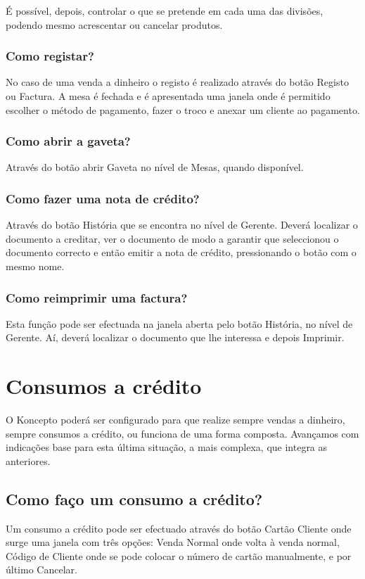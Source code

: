 \documentclass[a4paper,11pt,openany]{memoir}
\begin{document}
É possível, depois, controlar o que se pretende em cada uma das divisões, podendo mesmo acrescentar ou cancelar
produtos.


\subsection{Como registar?}
No caso de uma venda a dinheiro o registo é realizado através do botão Registo ou
Factura. A mesa é fechada e é apresentada uma janela onde é permitido escolher o
método de pagamento, fazer o troco e anexar um cliente ao pagamento.

\subsection{Como abrir a gaveta?}
Através do botão abrir Gaveta no nível de Mesas, quando disponível.


\subsection{Como fazer uma nota de crédito?}
Através do botão História que se encontra no nível de Gerente. Deverá localizar o
documento a creditar, ver o documento de modo a garantir que seleccionou o
documento correcto e então emitir a nota de crédito, pressionando o botão com o
mesmo nome.

\subsection{Como reimprimir uma factura?}
Esta função pode ser efectuada na janela aberta pelo botão História, no nível de
Gerente. Aí, deverá localizar o documento que lhe interessa e depois Imprimir.




\chapter{Consumos a crédito}

O Koncepto poderá ser configurado para que realize sempre vendas a dinheiro,
sempre consumos a crédito, ou funciona de uma forma composta. Avançamos com
indicações base para esta última situação, a mais complexa, que integra as
anteriores.

\section{Como faço um consumo a crédito?}
Um consumo a crédito pode ser efectuado através do botão Cartão Cliente onde
surge uma janela com três opções: Venda Normal onde volta à venda normal,
Código de Cliente onde se pode colocar o número de cartão manualmente, e por
último Cancelar.
\end{document}
